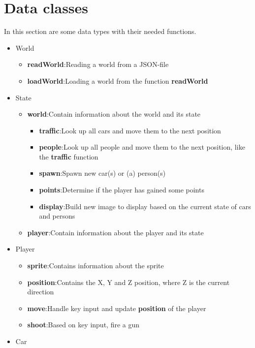 \documentclass[12pt]{article}
\begin{document}
	\section{Data classes}
	In this section are some data types with their needed functions.
	\begin{itemize}
		\item World
			\begin{itemize}				
				\item \textbf{readWorld}:\quad Reading a world from a JSON-file
				\item \textbf{loadWorld}:\quad Loading a world from the function \textbf{readWorld}
			\end{itemize}
		\item State
			\begin{itemize}				
				\item \textbf{world}:\quad Contain information about the world and its state
					\begin{itemize}				
						\item \textbf{traffic}:\quad Look up all cars and move them to the next position
						\item \textbf{people}:\quad Look up all people and move them to the next position, like the \textbf{traffic} function
						\item \textbf{spawn}:\quad Spawn new car(s) or (a) person(s)
						\item \textbf{points}:\quad Determine if the player has gained some points
						\item \textbf{display}:\quad Build new image to display based on the current state of cars and persons
					\end{itemize}
				\item \textbf{player}:\quad Contain information about the player and its state
			\end{itemize}
		\item Player
			\begin{itemize}				
				\item \textbf{sprite}:\quad Contains information about the sprite
				\item \textbf{position}:\quad Contains the X, Y and Z position, where Z is the current direction
				\item \textbf{move}:\quad Handle key input and update \textbf{position} of the player
				\item \textbf{shoot}:\quad Based on key input, fire a gun
			\end{itemize}
		\item Car

\end{itemize}
\end{document}
